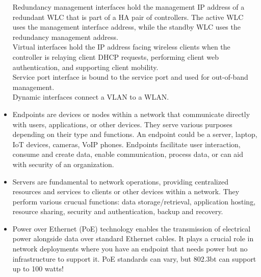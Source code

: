 \documentclass{article}
\begin{document}
\begin{itemize}
		Redundancy management interfaces hold the management IP address of a redundant WLC that is part of a HA pair of controllers. The active WLC uses the management interface address, while the standby WLC uses the redundancy management address.\\
		
		Virtual interfaces hold the IP address facing wireless clients when the controller is relaying client DHCP requests, performing client web authentication, and supporting client mobility.\\
		
		Service port interface is bound to the service port and used for out-of-band management.\\
		
		Dynamic interfaces connect a VLAN to a WLAN.
	\item[] Endpoints are devices or nodes within a network that communicate directly with users, applications, or other devices. They serve various purposes depending on their type and functions. An endpoint could be a server, laptop, IoT devices, cameras, VoIP phones. Endpoints facilitate user interaction, consume and create data, enable communication, process data, or can aid with security of an organization.
	\item[] Servers are fundamental to network operations, providing centralized resources and services to clients or other devices within a network. They perform various crucual functions: data storage/retrieval, application hosting, resource sharing, security and authentication, backup and recovery.
	\item[] Power over Ethernet (PoE) technology enables the transmission of electrical power alongside data over standard Ethernet cables. It plays a crucial role in network deployments where you have an endpoint that needs power but no infrastructure to support it. PoE standards can vary, but 802.3bt can support up to 100 watts!
  

\end{itemize}
\end{document}
